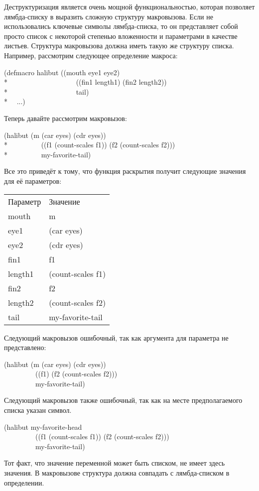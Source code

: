 \begin{defmac}
Деструктуризация является очень мощной функциональностью, которая позволяет
лямбда-списку в  выразить сложную структуру макровызова. Если
не использовались ключевые символы лямбда-списка, то он представляет собой
просто список с некоторой степенью вложенности и параметрами в качестве
листьев. Структура макровызова должна иметь такую же структуру списка.
Например, рассмотрим следующее определение макроса:
\begin{lisp}
(defmacro halibut ((mouth eye1 eye2) \\*
~~~~~~~~~~~~~~~~~~~((fin1 length1) (fin2 length2)) \\*
~~~~~~~~~~~~~~~~~~~tail) \\*
~~...)
\end{lisp}
Теперь давайте рассмотрим макровызов:
\begin{lisp}
(halibut (m (car eyes) (cdr eyes)) \\*
~~~~~~~~~((f1 (count-scales f1)) (f2 (count-scales f2))) \\*
~~~~~~~~~my-favorite-tail)
\end{lisp}
Все это приведёт к тому, что функция раскрытия получит следующие значения для её
параметров:
\begin{flushleft}
\begin{tabular}{@{}ll@{}}
\textrm{Параметр}&\textrm{Значение} \\
mouth&m \\
eye1&(car eyes) \\
eye2&(cdr eyes) \\
fin1&f1 \\
length1&(count-scales f1) \\
fin2&f2 \\
length2&(count-scales f2) \\
tail&my-favorite-tail \\
\end{tabular}
\end{flushleft}
Следующий макровызов ошибочный, так как аргумента для параметра  не
представлено:
\begin{lisp}
(halibut (m (car eyes) (cdr eyes)) \\
~~~~~~~~~((f1) (f2 (count-scales f2))) \\
~~~~~~~~~my-favorite-tail)
\end{lisp}
Следующий макровызов также ошибочный, так как на месте предполагаемого списка
указан символ.
\begin{lisp}
(halibut my-favorite-head \\
~~~~~~~~~((f1 (count-scales f1)) (f2 (count-scales f2))) \\
~~~~~~~~~my-favorite-tail)
\end{lisp}
Тот факт, что значение переменной  может быть списком, не
имеет здесь значения. В макровызове структура должна совпадать с лямбда-списком
в определении.


\end{defmac}
